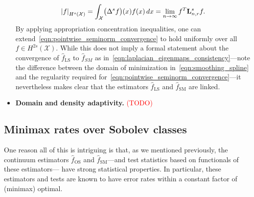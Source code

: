 \documentclass{article}
\newcommand{\abs}[1]{\left \lvert #1 \right \rvert}
\newcommand{\1}{\mathbf{1}}
\newcommand{\Lap}{{\bf L}}
\newcommand{\Xset}{\mathcal{X}}
\newcommand{\wh}[1]{\widehat{#1}}
\newcommand{\LS}{\mathrm{LS}}
\newcommand{\SM}{\mathrm{SM}}
\newcommand{\OS}{\mathrm{OS}}
\theoremstyle{alden}
\theoremstyle{aldenthm}
\theoremstyle{definition}
\theoremstyle{remark}
\begin{document}
\begin{itemize}
\begin{equation}
	\label{eqn:pointwise_seminorm_convergence}
	\abs{f}_{H^s(\Xset)} = \int_{\Xset} \bigl(\Delta^sf\bigr)(x) f(x) \,dx = \lim_{n \to \infty} f^T \Lap_{n,r}^s f.
	\end{equation}
	By applying appropriation concentration inequalities, one can extend~\eqref{eqn:pointwise_seminorm_convergence} to hold uniformly over all $f \in H^{2s}(\Xset)$. While this does not imply a formal statement about the convergence of $\wh{f}_{\LS}$ to $\wh{f}_{SM}$ as in~\eqref{eqn:laplacian_eigenmaps_consistency}---note the difference between the domain of minimization in~\eqref{eqn:smoothing_spline} and the regularity required for~\eqref{eqn:pointwise_seminorm_convergence}---it nevertheless makes clear that the estimators $\wh{f}_{\LS}$ and $\wh{f}_{\SM}$ are linked.
	\item \textbf{Domain and density adaptivity.} \textcolor{red}{(TODO)}
\end{itemize}

\subsection{Minimax rates over Sobolev classes}
\label{subsec:minimax_rates}
One reason all of this is intriguing is that, as we mentioned previously, the continuum estimators $\wh{f}_{\OS}$ and $\wh{f}_{\SM}$---and test statistics based on functionals of these estimators--- have strong statistical properties. In particular, these estimators and tests are known to have error rates within a constant factor of (minimax) optimal.
\end{document}
